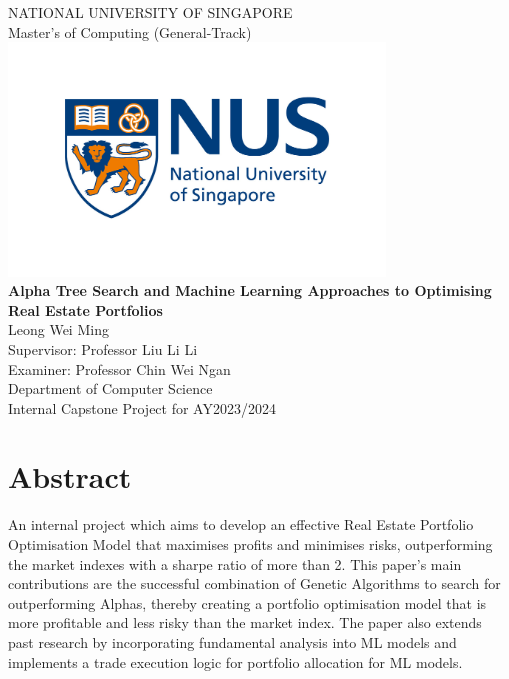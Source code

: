 \documentclass[a4paper,12pt]{report}
\numberwithin{equation}{section}
\theoremstyle{definition}
\begin{document}

\begin{center}
\Large NATIONAL UNIVERSITY OF SINGAPORE\\ 
\Large Master's of Computing (General-Track) \\ [0.2in]
\includegraphics[width=10cm]{1.nus_logo_full-horizontal} \\
\Large {\bf Alpha Tree Search and Machine Learning Approaches to Optimising Real Estate Portfolios}\\ [0.5in]
Leong Wei Ming \\
Supervisor: Professor Liu Li Li \\
Examiner: Professor Chin Wei Ngan \\ [0.3in]
Department of Computer Science \\
Internal Capstone Project for AY2023/2024
\end{center}

\chapter*{Abstract}
An internal project which aims to develop an effective Real Estate Portfolio Optimisation Model that maximises profits and minimises risks, outperforming the market indexes with a sharpe ratio of more than 2. This paper's main contributions are the successful combination of Genetic Algorithms to search for outperforming Alphas, thereby creating a portfolio optimisation model that is more profitable and less risky than the market index. The paper also extends past research by incorporating fundamental analysis into ML models and implements a trade execution logic for portfolio allocation for ML models. 
\end{document}
